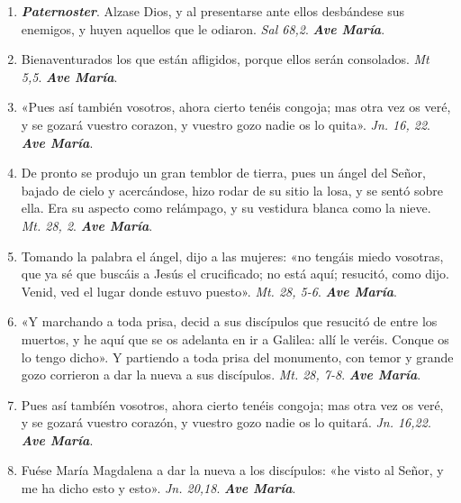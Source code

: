 \documentclass[../../devocionario.tex]{subfiles}
\begin{document}
    \begin{enumerate}
    
        \item \textbf{\textit{Paternoster}}. Alzase Dios, y al presentarse ante ellos desbándese sus enemigos, 
            y huyen aquellos que le odiaron. \textit{Sal 68,2}. \textbf{\textit{Ave María}}.

        \item Bienaventurados los que están afligidos, porque ellos serán consolados. \textit{Mt 5,5}. \textbf{\textit{Ave María}}.

        \item «Pues así también vosotros, ahora cierto tenéis congoja; mas otra vez os veré, y se gozará vuestro corazon, 
            y vuestro gozo nadie os lo quita». \textit{Jn. 16, 22}. \textbf{\textit{Ave María}}.

        \item De pronto se produjo un gran temblor de tierra, pues un ángel del Señor, bajado de cielo y acercándose, 
            hizo rodar de su sitio la losa, y se sentó sobre ella. Era su aspecto como relámpago, 
            y su vestidura blanca como la nieve. \textit{Mt. 28, 2}. \textbf{\textit{Ave María}}.

        \item Tomando la palabra el ángel, dijo a las mujeres: «no tengáis miedo vosotras, que ya sé que buscáis a Jesús el crucificado; 
            no está aquí; resucitó, como dijo. Venid, ved el lugar donde estuvo puesto». \textit{Mt. 28, 5-6}. \textbf{\textit{Ave María}}.

        \item «Y marchando a toda prisa, decid a sus discípulos que resucitó de entre los muertos, 
            y he aquí que se os adelanta en ir a Galilea: allí le veréis. Conque os lo tengo dicho». 
            Y partiendo a toda prisa del monumento, con temor y grande gozo corrieron a dar la nueva a sus discípulos. \textit{Mt. 28, 7-8}. \textbf{\textit{Ave María}}.

        \item Pues así tambíén vosotros, ahora cierto tenéis congoja; mas otra vez os veré, y se gozará vuestro corazón, 
            y vuestro gozo nadie os lo quitará. \textit{Jn. 16,22}. \textbf{\textit{Ave María}}.

        \item Fuése María Magdalena a dar la nueva a los discípulos: «he visto al Señor, 
            y me ha dicho esto y esto». \textit{Jn. 20,18}. \textbf{\textit{Ave María}}.


\end{enumerate}
\end{document}
